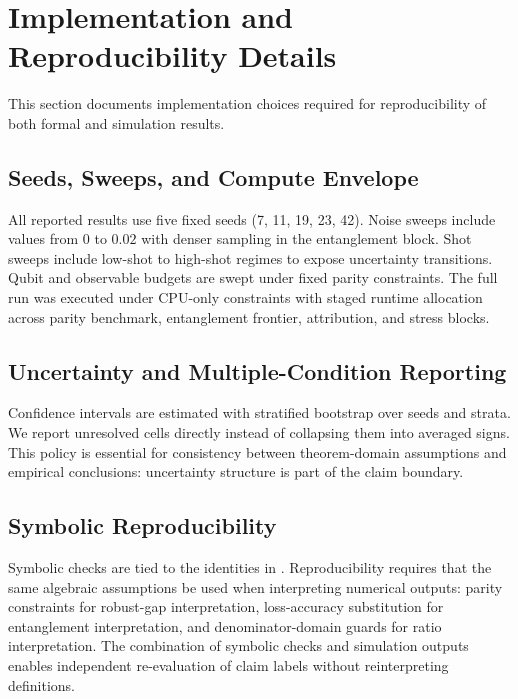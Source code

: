 \documentclass{article} %
\begin{document}
\section{Implementation and Reproducibility Details}
\label{app:repro}
This section documents implementation choices required for reproducibility of both formal and simulation results.

\subsection{Seeds, Sweeps, and Compute Envelope}
All reported results use five fixed seeds (7, 11, 19, 23, 42). Noise sweeps include values from $0$ to $0.02$ with denser sampling in the entanglement block. Shot sweeps include low-shot to high-shot regimes to expose uncertainty transitions. Qubit and observable budgets are swept under fixed parity constraints. The full run was executed under CPU-only constraints with staged runtime allocation across parity benchmark, entanglement frontier, attribution, and stress blocks.

\subsection{Uncertainty and Multiple-Condition Reporting}
Confidence intervals are estimated with stratified bootstrap over seeds and strata. We report unresolved cells directly instead of collapsing them into averaged signs. This policy is essential for consistency between theorem-domain assumptions and empirical conclusions: uncertainty structure is part of the claim boundary.

\subsection{Symbolic Reproducibility}
Symbolic checks are tied to the identities in . Reproducibility requires that the same algebraic assumptions be used when interpreting numerical outputs: parity constraints for robust-gap interpretation, loss-accuracy substitution for entanglement interpretation, and denominator-domain guards for ratio interpretation. The combination of symbolic checks and simulation outputs enables independent re-evaluation of claim labels without reinterpreting definitions.
\end{document}
